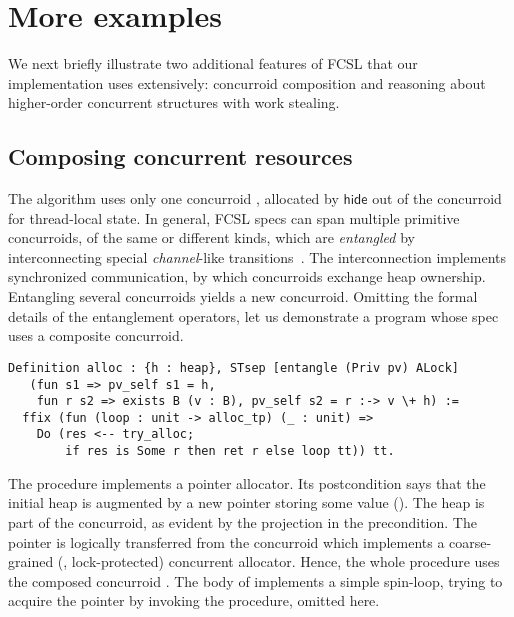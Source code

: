 \section{More examples}
\label{sec:more-examples}

We next briefly illustrate two additional features of FCSL that our
implementation uses extensively: concurroid composition and reasoning
about higher-order concurrent structures with work stealing.

\subsection{Composing concurrent resources}
\label{sec:comp-conc-reso}

The  algorithm uses only one concurroid ,
allocated by $\mathsf{hide}$ out of the concurroid  for
thread-local state.
%
In general, FCSL specs can span multiple primitive concurroids, of the
same or different kinds, which are \emph{entangled} by interconnecting
special \emph{channel}-like transitions~\cite{Nanevski-al:ESOP14}. The interconnection
implements synchronized communication, by which concurroids 
exchange heap ownership.
%
Entangling several concurroids yields a new concurroid.
%
Omitting the formal details of the entanglement
operators, let us demonstrate a program
whose spec uses a composite concurroid.
%
\begin{lstlisting}
Definition alloc : {h : heap}, STsep [entangle (Priv pv) ALock] 
   (fun s1 => pv_self s1 = h, 
    fun r s2 => exists B (v : B), pv_self s2 = r :-> v \+ h) := 
  ffix (fun (loop : unit -> alloc_tp) (_ : unit) =>
    Do (res <-- try_alloc; 
        if res is Some r then ret r else loop tt)) tt.  
\end{lstlisting}
%
The  procedure implements a pointer allocator. Its
postcondition says that the initial heap  is augmented by a
new pointer  storing some value  (). The
heap  is part of the  concurroid, as evident by the
projection  in the precondition. The pointer  is
logically transferred from the concurroid  which
implements a coarse-grained (\ie, lock-protected) concurrent
allocator. Hence, the whole procedure  uses the composed
concurroid .
%
The body of  implements a simple spin-loop, trying to
acquire the pointer by invoking the  procedure, omitted
here.

